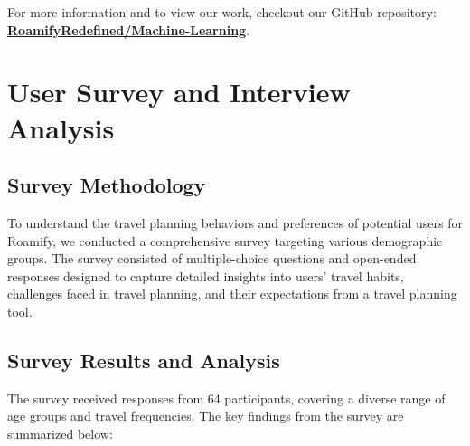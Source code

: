 \documentclass[conference]{IEEEtran}
\begin{document}
        For more information and to view our work, checkout our GitHub repository: \href{https://github.com/RoamifyRedefined/Machine-Learning}{\textbf{RoamifyRedefined/Machine-Learning}}.

\section{User Survey and Interview Analysis}

    \subsection{Survey Methodology}
        To understand the travel planning behaviors and preferences of potential users for Roamify, we conducted a comprehensive survey targeting various demographic groups. The survey consisted of multiple-choice questions and open-ended responses designed to capture detailed insights into users' travel habits, challenges faced in travel planning, and their expectations from a travel planning tool.

    \subsection{Survey Results and Analysis}
        The survey received responses from 64 participants, covering a diverse range of age groups and travel frequencies. The key findings from the survey are summarized below:
\end{document}
